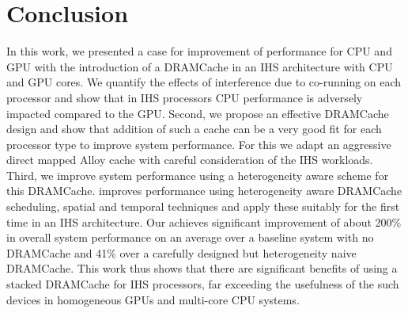 \section{Conclusion} \label{conclusion}
In this work, we presented a case for improvement of performance for CPU and GPU with the introduction of a DRAMCache in an IHS architecture with CPU and GPU cores. We quantify the effects of interference due to co-running on each processor and show that in IHS processors CPU performance is adversely impacted compared to the GPU. 
Second, we propose an effective DRAMCache design and show that addition of such a cache can be a very good fit for each processor type to improve system performance. For this we adapt an aggressive direct mapped Alloy cache with careful consideration of the IHS workloads.
Third, we improve system performance using a heterogeneity aware scheme for this DRAMCache. \cachename improves performance using heterogeneity aware DRAMCache scheduling, spatial and temporal techniques and apply these suitably for the first time in an IHS architecture. Our \cachename achieves significant improvement of about 200\% in overall system performance on an average over a baseline system with no DRAMCache and 41\% over a carefully designed but heterogeneity naive DRAMCache. This work thus shows that there are significant benefits of using a stacked DRAMCache for IHS processors, far exceeding the usefulness of the such devices in homogeneous GPUs and multi-core CPU systems.